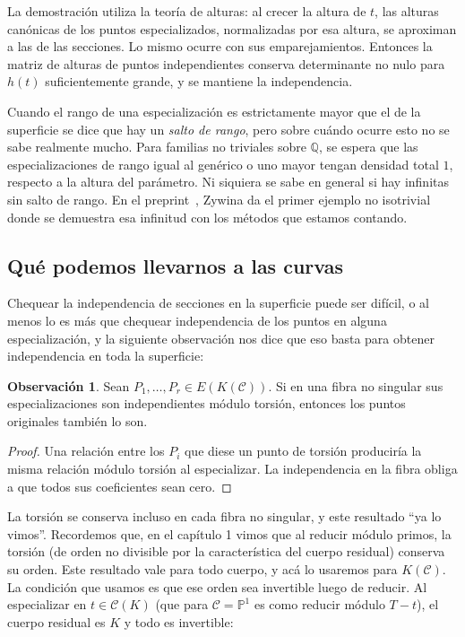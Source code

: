 \documentclass[a4paper]{book}
\theoremstyle{definition}
\newtheorem*{remark*}{Observación}
\theoremstyle{plain}
\newcommand{\QQ}{\mathbb{Q}}
\newcommand{\PP}{\mathbb{P}}
\newcommand{\cc}{\mathcal{C}}
\begin{document}
La demostración utiliza la teoría de alturas: al crecer la altura de $t$, las alturas canónicas de los puntos especializados, normalizadas por esa altura, se aproximan a las de las secciones. Lo mismo ocurre con sus emparejamientos. Entonces la matriz de alturas de puntos independientes conserva determinante no nulo para $h(t)$ suficientemente grande, y se mantiene la independencia. 

Cuando el rango de una especialización es estrictamente mayor que el de la superficie se dice que hay un \emph{salto de rango}, pero sobre cuándo ocurre esto no se sabe realmente mucho. Para familias no triviales sobre $\QQ$, se espera que las especializaciones de rango igual al genérico o uno mayor tengan densidad total $1$, respecto a la altura del parámetro. Ni siquiera se sabe en general si hay infinitas sin salto de rango. En el preprint~\cite{Zywina2025RankDoesNotJump}, Zywina da el primer ejemplo no isotrivial donde se demuestra esa infinitud con los métodos que estamos contando.

\subsection*{Qué podemos llevarnos a las curvas}

Chequear la independencia de secciones en la superficie puede ser difícil, o al menos lo es más que chequear independencia de los puntos en alguna especialización, y la siguiente observación nos dice que eso basta para obtener independencia en toda la superficie:

\begin{remark*}
Sean $P_1,\ldots,P_r\in E(K(\cc))$. Si en una fibra no singular sus especializaciones son independientes módulo torsión, entonces los puntos originales también lo son.
\end{remark*}
\begin{proof}
Una relación entre los $P_i$ que diese un punto de torsión produciría la misma relación módulo torsión al especializar. La independencia en la fibra obliga a que todos sus coeficientes sean cero.
\end{proof}

La torsión se conserva incluso en cada fibra no singular, y este resultado ``ya lo vimos''. Recordemos que, en el capítulo 1 vimos que al reducir módulo primos, la torsión (de orden no divisible por la característica del cuerpo residual) conserva su orden. Este resultado vale para todo cuerpo, y acá lo usaremos para $K(\cc)$. La condición que usamos es que ese orden sea invertible luego de reducir. Al especializar en $t\in\cc(K)$ (que para $\cc=\PP^1$ es como reducir módulo $T-t$), el cuerpo residual es $K$ y todo es invertible:
\end{document}
